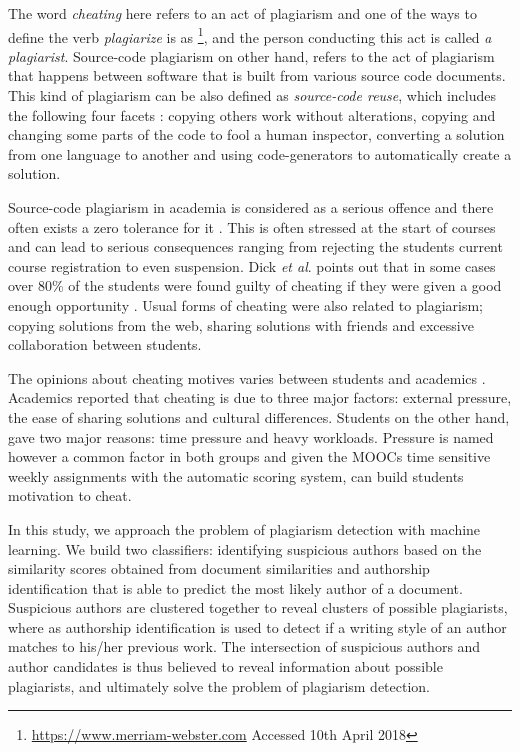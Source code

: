 \documentclass[english, grading]{tktltiki2}
\newcommand{\etal}{\textit{et al}. }
\theoremstyle{definition}
\theoremstyle{remark}
\numberwithin{equation}{section} %
\begin{document}
The word \emph{cheating} here refers to an act of plagiarism and one of the ways to define the verb \emph{plagiarize} is as \footnote{\url{https://www.merriam-webster.com} Accessed 10th April 2018}, and the person conducting this act is called \emph{a plagiarist}. Source-code plagiarism on other hand, refers to the act of plagiarism that happens between software that is built from various source code documents. This kind of plagiarism can be also defined as \emph{source-code reuse}, which includes the following four facets \cite{TDSCP2008}: copying others work without alterations, copying and changing some parts of the code to fool a human inspector, converting a solution from one language to another and using code-generators to automatically create a solution. 


Source-code plagiarism in academia is considered as a serious offence and there often exists a zero tolerance for it \cite{TDSCP2008}. This is often stressed at the start of courses and can lead to serious consequences ranging from rejecting the students current course registration to even suspension. Dick \etal points out that in some cases over 80\% of the students were found guilty of cheating if they were given a good enough opportunity \cite{Dick:2002:ASC:782941.783000}. Usual forms of cheating were also related to plagiarism; copying solutions from the web, sharing solutions with friends and excessive collaboration between students. 

The opinions about cheating motives varies between students and academics \cite{TDSCP2008}. Academics reported that cheating is due to three major factors: external pressure, the ease of sharing solutions and cultural differences. Students on the other hand, gave two major reasons: time pressure and heavy workloads. Pressure is named however a common factor in both groups and given the MOOCs time sensitive weekly assignments with the automatic scoring system, can build students motivation to cheat.

In this study, we approach the problem of plagiarism detection with machine learning. We build two classifiers: identifying suspicious authors based on the similarity scores obtained from document similarities and authorship identification that is able to predict the most likely author of a document. Suspicious authors are clustered together to reveal clusters of possible plagiarists, where as authorship identification is used to detect if a writing style of an author matches to his/her previous work. The intersection of suspicious authors and author candidates is thus believed to reveal information about possible plagiarists, and ultimately solve the problem of plagiarism detection. 
\end{document}
